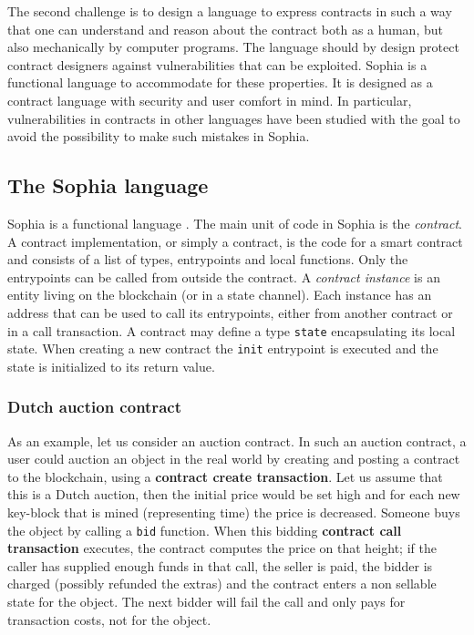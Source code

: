 The second challenge is to design a language to express contracts in
such a way that one can understand and reason about the contract
both as a human, but also mechanically by computer programs. The
language should by design protect contract designers against
vulnerabilities that can be exploited. Sophia is a functional language
to accommodate for these properties. It is designed as a contract
language with security and user comfort in mind. In particular,
vulnerabilities in contracts in other languages
\cite{atzei2017survey,mehar2019understanding,delmolino2016step} have been studied with the goal to
avoid the possibility to make such mistakes in Sophia.

\subsection{The Sophia language}

Sophia is a functional language \cite{hughes1989functional}.
The main unit of code in Sophia is the \textit{contract}.
A contract implementation, or simply a contract, is the code for a
smart contract and consists of a list of types, entrypoints and local
functions. Only the entrypoints can be called from outside the
contract.   A \textit{contract instance} is an entity living on the
blockchain (or in a state channel). Each instance has an address that
can be used to call its entrypoints, either from another contract or
in a call transaction.  A contract may define a type \texttt{state}
encapsulating its local state. When creating a new contract the
\texttt{init} entrypoint is executed and the state is initialized to its
return value.


\subsubsection{Dutch auction contract}

As an example, let us consider an auction contract.  In such an
auction contract, a user could auction an object in the real world by
creating and posting a contract to the blockchain, using a \textbf{contract
create transaction}. Let us assume that
this is a Dutch auction, then the initial price
would be set high and for each new key-block that is mined (representing
time) the price is decreased. Someone buys the object by calling a
\texttt{bid} function. When this bidding \textbf{contract call transaction} executes,
the contract computes the price on that height; if the caller has
supplied enough funds in that call, the seller is paid, the
bidder is charged (possibly refunded the extras) and the contract
enters a non sellable state for the object. The next bidder will fail
the call and only pays for transaction costs, not for the object.

